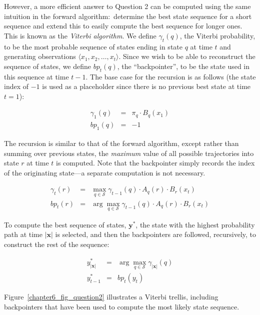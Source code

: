 However, a more efficient answer to Question 2 can be computed using
the same intuition in the forward algorithm:\ determine the best state
sequence for a short sequence and extend this to easily compute the
best sequence for longer ones.  This is known as the {\it Viterbi
  algorithm}.  We define $\gamma_t(q)$, the Viterbi probability, to be
the most probable sequence of states ending in state $q$ at time $t$
and generating observations $\langle x_1, x_2, \ldots , x_t \rangle$.
Since we wish to be able to reconstruct the sequence of states, we
define $bp_t(q)$, the ``backpointer'', to be the state used in this
sequence at time $t-1$.  The base case for the recursion is as follows
(the state index of $-1$ is used as a placeholder since there is no
previous best state at time $t=1$):

\begin{eqnarray*}
\gamma_1(q) &=& \pi_q \cdot B_q(x_1) \\
bp_1(q) & = & -1
\end{eqnarray*}

\noindent The recursion is similar to that of the forward algorithm,
except rather than summing over previous states, the \emph{maximum}
value of all possible trajectories into state $r$ at time $t$ is
computed.  Note that the backpointer simply records the index of the
originating state---a separate computation is not necessary.

\begin{eqnarray*}
\gamma_t(r) & = & \max_{q \in \mathcal{S}}  \gamma_{t-1}(q)  \cdot A_q(r) \cdot B_r(x_t)  \\
bp_t(r) & = & \arg \max_{q \in \mathcal{S}} \gamma_{t-1}(q)  \cdot A_q(r) \cdot B_r(x_t)
\end{eqnarray*}

\noindent To compute the best sequence of states, $\textbf{y}^*$, the
state with the highest probability path at time $|\textbf{x}|$ is
selected, and then the backpointers are followed, recursively, to
construct the rest of the sequence:

\begin{eqnarray*}
y_{|\textbf{x}|}^*& =& \arg \max_{q \in \mathcal{S}} \gamma_{|\textbf{x}|}(q)\\
y_{t-1}^* &=& bp_t(y_t)
\end{eqnarray*}

\noindent Figure~\ref{chapter6_fig_question2} illustrates a Viterbi
trellis, including backpointers that have been used to compute the
most likely state sequence.

